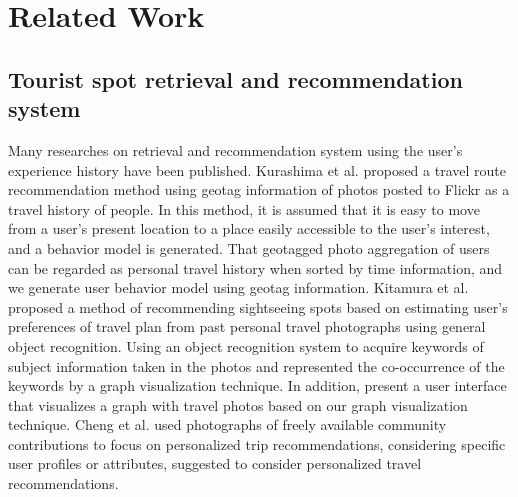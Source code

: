\documentclass[journal]{IAENGtran}
\begin{document}
\section{Related Work}
\label{sec:Related Work}
\subsection{Tourist spot retrieval and recommendation system}
\label{subsec:Tourist spot retrieval and recommendation system}

Many researches on retrieval and recommendation system using the user's experience history have been published.
Kurashima et al.\cite{Codd01} proposed a travel route recommendation method using geotag information of photos posted to Flickr as a travel history of people.
In this method, it is assumed that it is easy to move from a user's present location to a place easily accessible to the user's interest, and a behavior model is generated.
That geotagged photo aggregation of users can be regarded as personal travel history when sorted by time information, and we generate user behavior model using geotag information.
Kitamura et al.\cite{Codd02} proposed a method of recommending sightseeing spots based on estimating user's preferences of travel plan from past personal travel photographs using general object recognition.
Using an object recognition system to acquire keywords of subject information taken in the photos and represented the co-occurrence of the keywords by a graph visualization technique.
In addition, present a user interface that visualizes a graph with travel photos based on our graph visualization technique.
Cheng et al.\cite{Codd03} used photographs of freely available community contributions to focus on personalized trip recommendations, considering specific user profiles or attributes, suggested to consider personalized travel recommendations.
\end{document}
